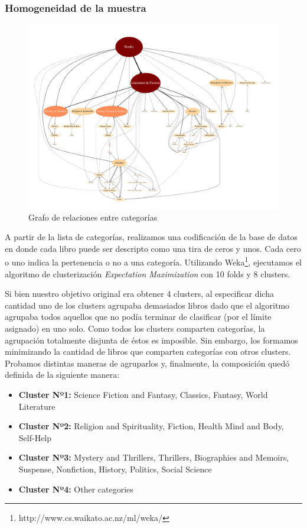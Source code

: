 \documentclass[12pt,journal,compsoc]{IEEEtran}
\begin{document}
\subsubsection{Homogeneidad de la muestra}

\begin{figure}[H]
  \centering
  \includegraphics[width=7.0in]{../results/graph.pdf}
  \caption{\small Grafo de relaciones entre categorías}
  \label{fig:jerarquizacionDeCategorias}  
\end{figure}

A partir de la lista de categorías, realizamos una codificación de la base de datos en donde cada libro puede ser descripto como una tira de ceros y unos. Cada cero o uno indica la pertenencia o no a una categoría. Utilizando Weka\footnote{http://www.cs.waikato.ac.nz/ml/weka/}, ejecutamos el algoritmo de clusterización \textit{Expectation Maximization} con 10 folds y 8 clusters. 

Si bien nuestro objetivo original era obtener 4 clusters, al especificar dicha cantidad uno de los clusters agrupaba demasiados libros dado que el algoritmo agrupaba todos aquellos que no podía terminar de clasificar (por el límite asignado) en uno solo. Como todos los clusters comparten categorías, la agrupación totalmente disjunta de éstos es imposible. Sin embargo, los formamos minimizando la cantidad de libros que comparten categorías con otros clusters. Probamos distintas maneras de agruparlos y, finalmente, la composición quedó definida de la siguiente manera:\\

\begin{itemize}
\item \textbf{Cluster Nº1:} Science Fiction and Fantasy, Classics, Fantasy, World Literature
\item \textbf{Cluster Nº2:} Religion and Spirituality, Fiction, Health Mind and Body, Self-Help
\item \textbf{Cluster Nº3:} Mystery and Thrillers, Thrillers, Biographies and Memoirs, Suspense, Nonfiction, History, Politics, Social Science
\item \textbf{Cluster Nº4:} Other categories
\end{itemize}
\end{document}
